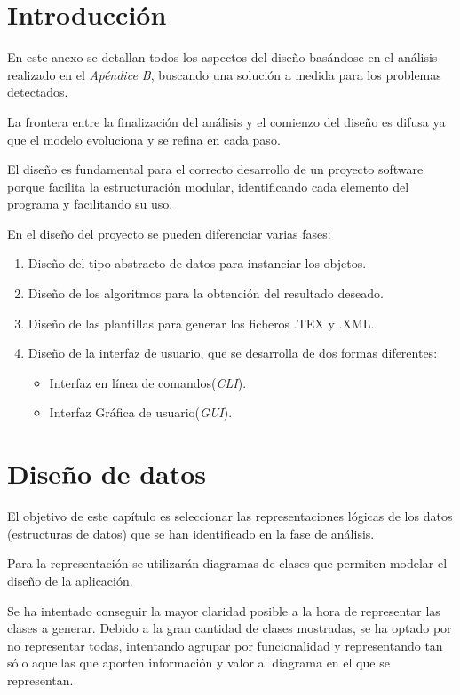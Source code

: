 
\section{Introducción}
En este anexo se detallan todos los aspectos del diseño basándose en el análisis realizado en el
\textit{Apéndice B}, buscando una solución a medida para los problemas detectados.

La frontera entre la finalización del análisis y el comienzo del diseño es difusa ya que el modelo evoluciona y se refina en cada paso.

El diseño es fundamental para el correcto desarrollo de un proyecto software porque facilita la estructuración modular, identificando cada elemento del programa y facilitando su uso.

En el diseño del proyecto se pueden diferenciar varias fases:
\begin{enumerate}
\item Diseño del tipo abstracto de datos para instanciar los objetos.
\item Diseño de los algoritmos para la obtención del resultado deseado.
\item Diseño de las plantillas para generar los ficheros .TEX y .XML.
\item Diseño de la interfaz de usuario, que se desarrolla de dos formas diferentes:
\begin{itemize}
\item Interfaz en línea de comandos(\textit{CLI}).
\item Interfaz Gráfica de usuario(\textit{GUI}).
\end{itemize}
\end{enumerate}
\newpage
\section{Diseño de datos}
El objetivo de este capítulo es seleccionar las representaciones lógicas de los datos (estructuras
de datos) que se han identificado en la fase de análisis.

Para la representación se utilizarán diagramas de clases que permiten modelar el diseño de la aplicación.

Se ha intentado conseguir la mayor claridad posible a la hora de representar las clases a generar. Debido a la gran cantidad de clases mostradas, se ha optado por no representar todas, intentando agrupar por funcionalidad y representando tan sólo aquellas que aporten información y valor al diagrama en el que se representan.


